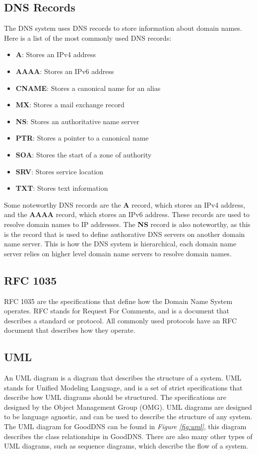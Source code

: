 \documentclass[12pt]{article}
\begin{document}
\subsection{DNS Records}
The DNS\cite{DomainNamesImplementation1987} system uses DNS\cite{DomainNamesImplementation1987} records to store information about domain names. 
Here is a list of the most commonly used DNS records:
\begin{itemize}
    \item \textbf{A}: Stores an IPv4 address
    \item \textbf{AAAA}: Stores an IPv6 address
    \item \textbf{CNAME}: Stores a canonical name for an alias
    \item \textbf{MX}: Stores a mail exchange record
    \item \textbf{NS}: Stores an authoritative name server
    \item \textbf{PTR}: Stores a pointer to a canonical name
    \item \textbf{SOA}: Stores the start of a zone of authority
    \item \textbf{SRV}: Stores service location
    \item \textbf{TXT}: Stores text information
\end{itemize}
Some noteworthy DNS records are the \textbf{A} record, which stores an IPv4 address, and the \textbf{AAAA} record, which stores an IPv6 address. 
These records are used to resolve domain names to IP addresses. The \textbf{NS} record is also noteworthy, as this is the record that is used
to define authorative DNS servers on another domain name server. This is how the DNS system is hierarchical, each domain name server
relies on higher level domain name servers to resolve domain names.

\subsection{RFC 1035}
RFC 1035\cite{DomainNamesImplementation1987} are the specifications that define how the Domain Name System operates. 
RFC stands for Request For Comments, and is a document that describes a standard or protocol.
All commonly used protocols have an RFC document that describes how they operate.

\subsection{UML}
An UML\cite{UnifiedModelingLanguage} diagram is a diagram that describes the structure of a system. UML stands for Unified Modeling Language, 
and is a set of strict specifications that describe how UML diagrams should be structured. The specifications are designed by the 
Object Management Group\cite{https://themeforest.net/user/dan_fisherOMGObjectManagement} (OMG). UML diagrams are designed to be language agnostic, and
can be used to describe the structure of any system. The UML diagram for GoodDNS can be found in \textit{Figure \ref{fig:uml}}, this diagram describes the 
class relationships in GoodDNS. There are also many other types of UML diagrams, such as sequence diagrams, which describe the flow of a system.
\end{document}
